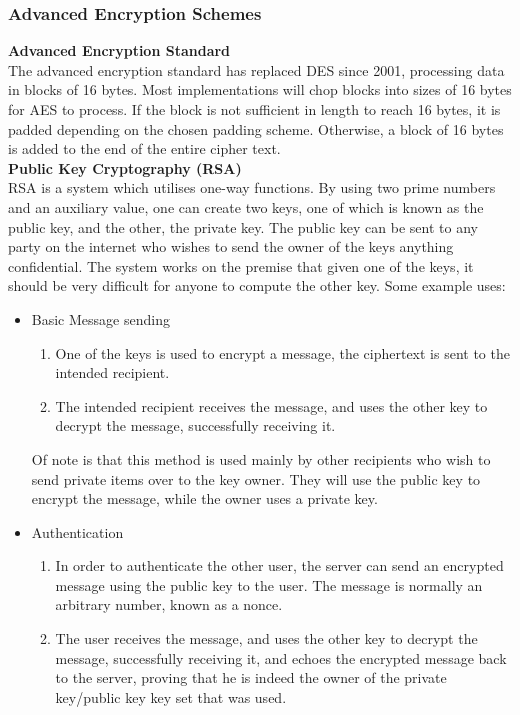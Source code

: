 \documentclass{article}
\begin{document}
\subsubsection{Advanced Encryption Schemes}
\textbf{Advanced Encryption Standard}\\
The advanced encryption standard has replaced DES since 2001, processing data in blocks of 16 bytes. Most implementations will chop blocks into sizes of 16 bytes for AES to process. If the block is not sufficient in length to reach 16 bytes, it is padded depending on the chosen padding scheme. Otherwise, a block of 16 bytes is added to the end of the entire cipher text.\\
\textbf{Public Key Cryptography (RSA)}\\
RSA is a system which utilises one-way functions. By using two prime numbers and an auxiliary value, one can create two keys, one of which is known as the public key, and the other, the private key. The public key can be sent to any party on the internet who wishes to send the owner of the keys anything confidential. The system works on the premise that given one of the keys, it should be very difficult for anyone to compute the other key. Some example uses:\\
\begin{itemize}

\item Basic Message sending
\begin{enumerate}
    \item One of the keys is used to encrypt a message, the ciphertext is sent to the intended recipient.
    \item The intended recipient receives the message, and uses the other key to decrypt the message, successfully receiving it.
\end{enumerate}
Of note is that this method is used mainly by other recipients who wish to send private items over to the key owner. They will use the public key to encrypt the message, while the owner uses a private key.

\item Authentication
\begin{enumerate}
    \item In order to authenticate the other user, the server can send an encrypted message using the public key to the user. The message is normally an arbitrary number, known as a nonce.
    \item The user receives the message, and uses the other key to decrypt the message, successfully receiving it, and echoes the encrypted message back to the server, proving that he is indeed the owner of the private key/public key key set that was used. 
\end{enumerate}

\end{itemize}
\end{document}
